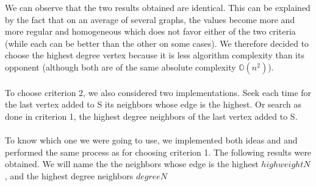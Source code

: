     We can observe that the two results obtained are identical. This can be explained by the fact that on an average of several graphs, the values become more and more regular and homogeneous which does not favor either of the two criteria (while each can be better than the other on some cases). We therefore decided to choose the highest degree vertex because it is less algorithm complexity than its opponent (although both are of the same absolute complexity $\mathbb{O}(n^2)$). 
    \\ \\
    To choose criterion 2, we also considered two implementations. Seek each time for the last vertex added to S its neighbors whose edge is the highest. Or search as done in criterion 1, the highest degree neighbors of the last vertex added to S.
    \\ \\
    To know which one we were going to use, we implemented both ideas and and performed the same process as for choosing criterion 1. The following results were obtained. We will name the the neighbors whose edge is the highest $highweightN$, and the highest degree neighbors $degreeN$
    \\ \\
